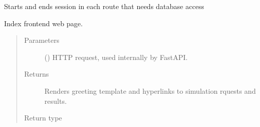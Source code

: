 \documentclass[a4paper,landscape,10pt,english]{sphinxmanual}
\begin{document}

\begin{fulllineitems}
\label{\detokenize{code_docs/simulation_api.controller:simulation_api.controller.main.get_db}}
Starts and ends session in each route that needs database access

\end{fulllineitems}


\begin{fulllineitems}
\label{\detokenize{code_docs/simulation_api.controller:simulation_api.controller.main.index}}
Index frontend web page.
\begin{quote}\begin{description}
\item[{Parameters}] \leavevmode
{} () \textendash{} HTTP request, used internally by FastAPI.

\item[{Returns}] \leavevmode
Renders greeting template and hyperlinks to simulation rquests and
results.

\item[{Return type}] \leavevmode
{}

\end{description}\end{quote}

\end{fulllineitems}

\end{document}
